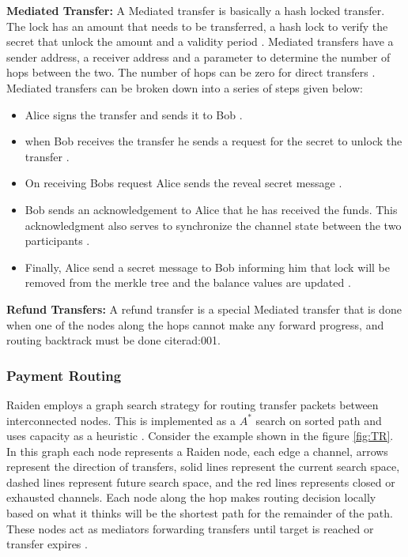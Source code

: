 \textbf{Mediated Transfer:} A Mediated transfer is basically a hash locked transfer. The lock has an amount that needs to be transferred, a hash lock to verify the secret that unlock the amount and a validity period \cite{rad:001}. Mediated transfers have a sender address, a receiver address and a parameter to determine the number of hops between the two. The number of hops can be zero for direct transfers \cite{rad:001}. Mediated transfers can be broken down into a series of steps given below:
\begin{itemize}

\item Alice signs the transfer and sends it to Bob \cite{rad:001}.
\item when Bob receives the transfer he sends a request for the secret to unlock the transfer \cite{rad:001}.
\item On receiving Bobs request Alice sends the reveal secret message \cite{rad:001}.
\item Bob sends an acknowledgement to Alice that he has received the funds. This acknowledgment also serves to synchronize the channel state between the two participants \cite{rad:001}.
\item Finally, Alice send a secret message to Bob informing him that lock will be removed from the merkle tree and the balance values are updated \cite{rad:001}. 
\end{itemize}

\textbf{Refund Transfers:} A refund transfer is a special Mediated transfer that is done when one of the nodes along the hops cannot make any forward progress, and routing backtrack must be done cite{rad:001}.  
	
\subsubsection{Payment Routing} \label{NP}	
Raiden employs a graph search strategy for routing transfer packets between interconnected nodes. This is implemented as a $A^*$ search on sorted path and uses capacity as a heuristic \cite{rad:001}.  Consider the example shown in the figure \ref{fig:TR}. In this graph each node represents a Raiden node, each edge a channel, arrows represent the direction of transfers, solid lines represent the current search space, dashed lines represent future search space, and the red lines represents closed or exhausted channels. Each node along the hop makes routing decision locally based on what it thinks will be the shortest path for the remainder of the path. These nodes act as mediators forwarding transfers until target is reached or transfer expires \cite{rad:001}.

